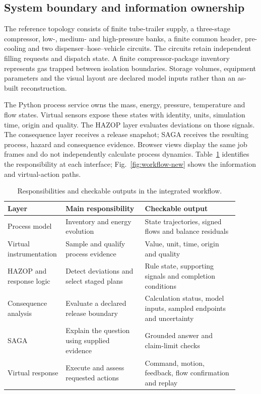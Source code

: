 \documentclass[12pt,a4paper]{article}
\begin{document}
\subsection{System boundary and information ownership}
The reference topology consists of finite tube-trailer supply, a three-stage
compressor, low-, medium- and high-pressure banks, a finite common header,
pre-cooling and two dispenser--hose--vehicle circuits. The circuits retain
independent filling requests and dispatch state. A finite compressor-package
inventory represents gas trapped between isolation boundaries. Storage volumes,
equipment parameters and the visual layout are declared model inputs rather
than an as-built reconstruction.

The Python process service owns the mass, energy, pressure, temperature and
flow states. Virtual sensors expose these states with identity, units,
simulation time, origin and quality. The HAZOP layer evaluates deviations on
those signals. The consequence layer receives a release snapshot; SAGA receives
the resulting process, hazard and consequence evidence. Browser views display
the same job frames and do not independently calculate process dynamics.
Table~\ref{tab:architecture} identifies the responsibility at each interface;
Fig.~\ref{fig:workflow-new} shows the information and virtual-action paths.

\begin{table}[htbp]
\centering\small
\caption{Responsibilities and checkable outputs in the integrated workflow.}
\label{tab:architecture}
\begin{tabular}{>{\raggedright\arraybackslash}p{0.19\linewidth}
                >{\raggedright\arraybackslash}p{0.33\linewidth}
                >{\raggedright\arraybackslash}p{0.39\linewidth}}
\toprule
Layer & Main responsibility & Checkable output \\
\midrule
Process model & Inventory and energy evolution & State trajectories, signed flows and balance residuals \\
Virtual instrumentation & Sample and qualify process evidence & Value, unit, time, origin and quality \\
HAZOP and response logic & Detect deviations and select staged plans & Rule state, supporting signals and completion conditions \\
Consequence analysis & Evaluate a declared release boundary & Calculation status, model inputs, sampled endpoints and uncertainty \\
SAGA & Explain the question using supplied evidence & Grounded answer and claim-limit checks \\
Virtual response & Execute and assess requested actions & Command, motion, feedback, flow confirmation and replay \\
\bottomrule
\end{tabular}
\end{table}
\end{document}
